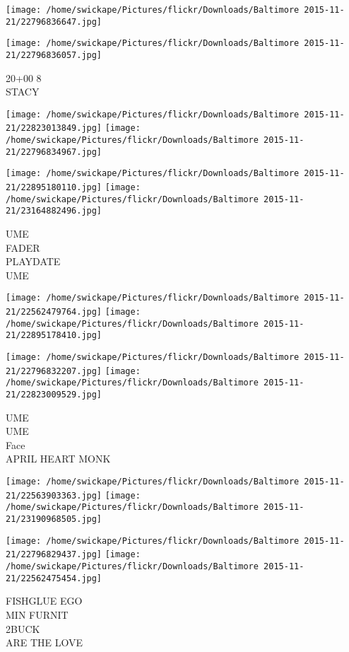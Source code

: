 \documentclass[10pt,letterpaper]{article}
\begin{document}
\texttt{[image: /home/swickape/Pictures/flickr/Downloads/Baltimore 2015-11-21/22796836647.jpg]}

\vspace{0.25in}
\texttt{[image: /home/swickape/Pictures/flickr/Downloads/Baltimore 2015-11-21/22796836057.jpg]}

20+00 8\\
STACY\\
\pagebreak

\texttt{[image: /home/swickape/Pictures/flickr/Downloads/Baltimore 2015-11-21/22823013849.jpg]}
\texttt{[image: /home/swickape/Pictures/flickr/Downloads/Baltimore 2015-11-21/22796834967.jpg]}

\texttt{[image: /home/swickape/Pictures/flickr/Downloads/Baltimore 2015-11-21/22895180110.jpg]}
\texttt{[image: /home/swickape/Pictures/flickr/Downloads/Baltimore 2015-11-21/23164882496.jpg]}

UME\\
FADER\\
PLAYDATE\\
UME\\
\pagebreak

\texttt{[image: /home/swickape/Pictures/flickr/Downloads/Baltimore 2015-11-21/22562479764.jpg]}
\texttt{[image: /home/swickape/Pictures/flickr/Downloads/Baltimore 2015-11-21/22895178410.jpg]}

\texttt{[image: /home/swickape/Pictures/flickr/Downloads/Baltimore 2015-11-21/22796832207.jpg]}
\texttt{[image: /home/swickape/Pictures/flickr/Downloads/Baltimore 2015-11-21/22823009529.jpg]}

UME\\
UME\\
Face\\
APRIL HEART MONK\\
\pagebreak

\texttt{[image: /home/swickape/Pictures/flickr/Downloads/Baltimore 2015-11-21/22563903363.jpg]}
\texttt{[image: /home/swickape/Pictures/flickr/Downloads/Baltimore 2015-11-21/23190968505.jpg]}

\texttt{[image: /home/swickape/Pictures/flickr/Downloads/Baltimore 2015-11-21/22796829437.jpg]}
\texttt{[image: /home/swickape/Pictures/flickr/Downloads/Baltimore 2015-11-21/22562475454.jpg]}

FISHGLUE EGO\\
MIN FURNIT\\
2BUCK\\
ARE THE LOVE\\
\pagebreak
\end{document}
